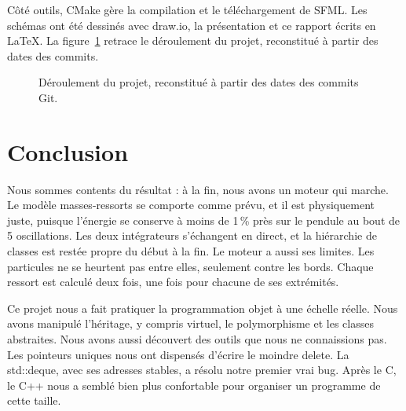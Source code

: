 \documentclass[11pt,a4paper]{article}
\newcommand{\code}[1]{{\ttfamily\color{combislate}#1}}
\begin{document}
Côté outils, CMake gère la compilation et le téléchargement de SFML. Les schémas ont été dessinés
avec draw.io, la présentation et ce rapport écrits en LaTeX. La figure~\ref{fig:gantt} retrace le
déroulement du projet, reconstitué à partir des dates des commits.

\begin{figure}[htbp]\centering
{}
\caption{Déroulement du projet, reconstitué à partir des dates des commits Git.}\label{fig:gantt}
\end{figure}

\section{Conclusion}

Nous sommes contents du résultat : à la fin, nous avons un moteur qui marche. Le modèle masses-ressorts
se comporte comme prévu, et il est physiquement juste, puisque l'énergie se conserve à moins de 1\,\%
près sur le pendule au bout de 5 oscillations. Les deux intégrateurs s'échangent en direct, et la hiérarchie de classes est restée
propre du début à la fin. Le moteur a aussi ses limites. Les particules ne se heurtent pas entre elles,
seulement contre les bords. Chaque ressort est calculé deux fois, une fois pour chacune de ses
extrémités.

Ce projet nous a fait pratiquer la programmation objet à une échelle réelle. Nous avons manipulé
l'héritage, y compris virtuel, le polymorphisme et les classes abstraites. Nous avons aussi découvert
des outils que nous ne connaissions pas. Les pointeurs uniques nous ont dispensés d'écrire le moindre
\code{delete}. La \code{std::deque}, avec ses adresses stables, a résolu notre premier vrai bug. Après
le C, le C++ nous a semblé bien plus confortable pour organiser un programme de cette taille.
\end{document}
